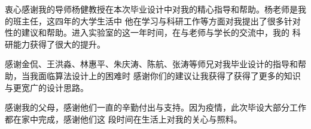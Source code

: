 \begin{acknowledgement}
  衷心感谢我的导师杨健教授在本次毕业设计中对我的精心指导和帮助。杨老师是我的班主任，这四年的大学生活中
  他在学习与科研工作等方面对我提出了很多针对性的建议和帮助。进入实验室的这一年时间，在与老师与学长的交流中，我的
  科研能力获得了很大的提升。

  感谢金侃、王洪淼、林惠平、朱庆涛、陈航、张涛等师兄对我毕业设计的指导和帮助，当我面临算法设计上的困难时
  感谢你们的建议让我获得了获得了更多的知识与更宽广的设计思路。

  感谢我的父母，感谢他们一直的辛勤付出与支持。因为疫情，此次毕设大部分工作都在家中完成，感谢他们这
  段时间在生活上对我的关心与照料。

\end{acknowledgement}
